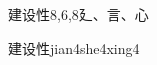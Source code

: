 \begin{entry}{建设性}{8,6,8}{⼵、⾔、⼼}
  \begin{phonetics}{建设性}{jian4she4xing4}
  \end{phonetics}
\end{entry}
